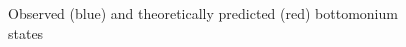 \begin{figure}[H]
  \setlength{\unitlength}{1mm}
  \centering
\caption{Observed (blue) and theoretically predicted (red) bottomonium states}
\label{fig:bottomonium}
\end{figure} 
